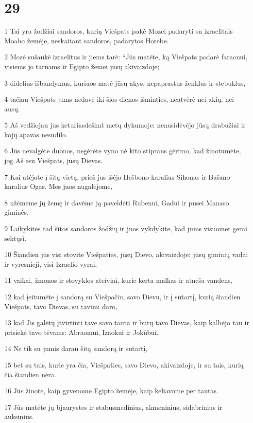 \chapter{29}

\par 1 Tai yra žodžiai sandoros, kurią Viešpats įsakė Mozei padaryti su izraelitais Moabo žemėje, neskaitant sandoros, padarytos Horebe. 
\par 2 Mozė sušaukė izraelitus ir jiems tarė: “Jūs matėte, ką Viešpats padarė faraonui, visiems jo tarnams ir Egipto žemei jūsų akivaizdoje; 
\par 3 didelius išbandymus, kuriuos matė jūsų akys, nepaprastus ženklus ir stebuklus, 
\par 4 tačiau Viešpats jums nedavė iki šios dienos išminties, neatvėrė nei akių, nei ausų. 
\par 5 Aš vedžiojau jus keturiasdešimt metų dykumoje: nenusidėvėjo jūsų drabužiai ir kojų apavas nesudilo. 
\par 6 Jūs nevalgėte duonos, negėrėte vyno nė kito stipraus gėrimo, kad žinotumėte, jog Aš esu Viešpats, jūsų Dievas. 
\par 7 Kai atėjote į šitą vietą, prieš jus išėjo Hešbono karalius Sihonas ir Bašano karalius Ogas. Mes juos nugalėjome, 
\par 8 užėmėme jų žemę ir davėme ją paveldėti Rubenui, Gadui ir pusei Manaso giminės. 
\par 9 Laikykitės tad šitos sandoros žodžių ir juos vykdykite, kad jums visuomet gerai sektųsi. 
\par 10 Šiandien jūs visi stovite Viešpaties, jūsų Dievo, akivaizdoje: jūsų giminių vadai ir vyresnieji, visi Izraelio vyrai, 
\par 11 vaikai, žmonos ir stovyklos ateiviai, kurie kerta malkas ir atneša vandens, 
\par 12 kad įeitumėte į sandorą su Viešpačiu, savo Dievu, ir į sutartį, kurią šiandien Viešpats, tavo Dievas, su tavimi daro, 
\par 13 kad Jis galėtų įtvirtinti tave savo tauta ir būtų tavo Dievas, kaip kalbėjo tau ir prisiekė tavo tėvams: Abraomui, Izaokui ir Jokūbui. 
\par 14 Ne tik su jumis darau šitą sandorą ir sutartį, 
\par 15 bet su tais, kurie yra čia, Viešpaties, savo Dievo, akivaizdoje, ir su tais, kurių čia šiandien nėra. 
\par 16 Jūs žinote, kaip gyvenome Egipto žemėje, kaip keliavome per tautas. 
\par 17 Jūs matėte jų bjaurystes ir stabus­medinius, akmeninius, sidabrinius ir auksinius. 
